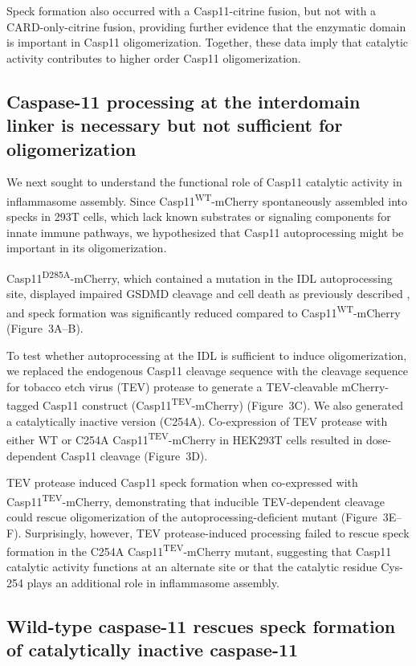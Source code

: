 \documentclass[11pt]{article}
\begin{document}
Speck formation also occurred with a Casp11-citrine fusion, but not with a CARD-only-citrine fusion, providing further evidence that the enzymatic domain is important in Casp11 oligomerization. Together, these data imply that catalytic activity contributes to higher order Casp11 oligomerization.

\subsection{Caspase-11 processing at the interdomain linker is necessary but not sufficient for oligomerization}

We next sought to understand the functional role of Casp11 catalytic activity in inflammasome assembly. Since Casp11\textsuperscript{WT}-mCherry spontaneously assembled into specks in 293T cells, which lack known substrates or signaling components for innate immune pathways, we hypothesized that Casp11 autoprocessing might be important in its oligomerization.

Casp11\textsuperscript{D285A}-mCherry, which contained a mutation in the IDL autoprocessing site, displayed impaired GSDMD cleavage and cell death as previously described \citep{lee2018caspase11,ross2018casp11}, and speck formation was significantly reduced compared to Casp11\textsuperscript{WT}-mCherry (Figure~3A--B).

To test whether autoprocessing at the IDL is sufficient to induce oligomerization, we replaced the endogenous Casp11 cleavage sequence with the cleavage sequence for tobacco etch virus (TEV) protease to generate a TEV-cleavable mCherry-tagged Casp11 construct (Casp11\textsuperscript{TEV}-mCherry) (Figure~3C). We also generated a catalytically inactive version (C254A). Co-expression of TEV protease with either WT or C254A Casp11\textsuperscript{TEV}-mCherry in HEK293T cells resulted in dose-dependent Casp11 cleavage (Figure~3D).

TEV protease induced Casp11 speck formation when co-expressed with Casp11\textsuperscript{TEV}-mCherry, demonstrating that inducible TEV-dependent cleavage could rescue oligomerization of the autoprocessing-deficient mutant (Figure~3E--F). Surprisingly, however, TEV protease-induced processing failed to rescue speck formation in the C254A Casp11\textsuperscript{TEV}-mCherry mutant, suggesting that Casp11 catalytic activity functions at an alternate site or that the catalytic residue Cys-254 plays an additional role in inflammasome assembly.

\subsection{Wild-type caspase-11 rescues speck formation of catalytically inactive caspase-11}
\end{document}
